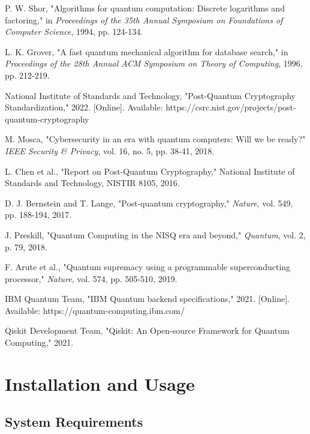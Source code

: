 \documentclass[11pt]{article}
\begin{document}
\begin{thebibliography}{99}

P. W. Shor, "Algorithms for quantum computation: Discrete logarithms and factoring," in \emph{Proceedings of the 35th Annual Symposium on Foundations of Computer Science}, 1994, pp. 124-134.

L. K. Grover, "A fast quantum mechanical algorithm for database search," in \emph{Proceedings of the 28th Annual ACM Symposium on Theory of Computing}, 1996, pp. 212-219.

National Institute of Standards and Technology, "Post-Quantum Cryptography Standardization," 2022. [Online]. Available: https://csrc.nist.gov/projects/post-quantum-cryptography

M. Mosca, "Cybersecurity in an era with quantum computers: Will we be ready?" \emph{IEEE Security \& Privacy}, vol. 16, no. 5, pp. 38-41, 2018.

L. Chen et al., "Report on Post-Quantum Cryptography," National Institute of Standards and Technology, NISTIR 8105, 2016.

D. J. Bernstein and T. Lange, "Post-quantum cryptography," \emph{Nature}, vol. 549, pp. 188-194, 2017.

J. Preskill, "Quantum Computing in the NISQ era and beyond," \emph{Quantum}, vol. 2, p. 79, 2018.

F. Arute et al., "Quantum supremacy using a programmable superconducting processor," \emph{Nature}, vol. 574, pp. 505-510, 2019.

IBM Quantum Team, "IBM Quantum backend specifications," 2021. [Online]. Available: https://quantum-computing.ibm.com/

Qiskit Development Team, "Qiskit: An Open-source Framework for Quantum Computing," 2021.

\end{thebibliography}

\appendix

\section{Installation and Usage}

\subsection{System Requirements}
\end{document}
